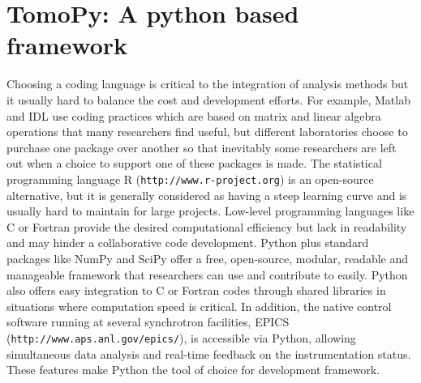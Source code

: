 \documentclass[pdf]{iucr}              %
\begin{document}
\section{TomoPy: A python based framework}

Choosing a coding language is critical to the integration of analysis methods but it usually hard to balance the cost and development efforts. For example, Matlab and IDL use coding practices which are based on matrix and linear algebra operations that many researchers find useful, but different laboratories choose to purchase one package over another so that inevitably some researchers are left out when a choice to support one of these packages is made. The statistical programming language R (\texttt{http://www.r-project.org}) is an open-source alternative, but it is generally considered as having a steep learning curve and is usually hard to maintain for large projects. Low-level programming languages like C or Fortran provide the desired computational efficiency but lack in readability and may hinder a collaborative code development. Python plus standard packages like NumPy and SciPy offer a free, open-source, modular, readable and manageable framework that researchers can use and contribute to easily.  Python also offers easy integration to C or Fortran codes through shared libraries in situations where computation speed is critical.  In addition, the native  control software running at several synchrotron facilities, EPICS (\texttt{http://www.aps.anl.gov/epics/}), is accessible via Python, allowing simultaneous data analysis and real-time feedback on the instrumentation status. These features make Python the tool of choice for development framework.


\end{document}
